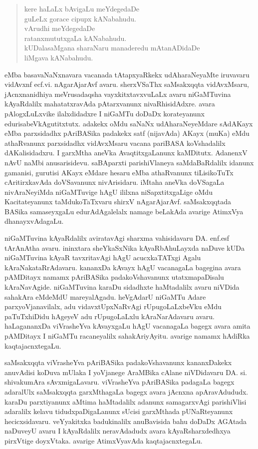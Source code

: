 \begin{quote}
kere haLaLx bAvigaLu meYdegedaDe\\[2pt]
guLeLx gorace cipupx kANabahudu.\\[2pt]
vArudhi meYdegedaDe\\[2pt]
ratanxmututxgaLa kANabahudu.\\[2pt]
kUDalasaMgana sharaNaru manaderedu mAtanADidaDe\\[2pt]
liMgava kANabahudu. 
\end{quote}

eMba basavaNaNxnavara vacanada tAtapxyaRkekx udAharaNeyaMte iruvavaru vidAvxnf ecf.vi. nAgarAjarAvf avaru. sherxVSaThx saMsakxqqta vidAvxMsaru, jAcnxnanidhiya meVrusadaqsha vayxkitxtavxvuLaLx avaru niGaMTuvina kAyaRdalilx mahatatxravAda pAtarxvanunx nivaRhi\-sidAdxre. avara pAlogxLuLxvike ilalxdidadxre I niGaMTu doDaDx korateyanunx edurisabeVkAgutitxtutx. adakekx oMdu saNaNx udA\-haraNeyeMdare sAdAKayx eMba parxsidadhx pAriBASika padakekx satf (nijavAda) AKayx (muKa) eMdu athaRvanunx parxsidadhx vidAvxMsaru vacana pariBASA koVshadalilx dAKalisidadxru. I garxMtha aneVka AvaqtitxgaLanunx kaMDitutx. AdanenxV nAvU naMbi anusarisidevu. saBAparxti parishiVlaneya saMdaBaRdalilx idanunx gamanisi, gurutisi AKayx eMdare hesaru eMba athaRvanunx tiLisikoTuTx cAritirxkavAda doVSavanunx nivArisidaru. iMtaha aneVka doVSagaLa nivAraNeyiMda niGaMTuvige hAgU ililxna  niSapxtitxgaLige oMdu Kacitateyanunx taMdukoTaTxvaru shirxV nAgarAjarAvf. saMsakxqqtada BASika samaseyxgaLu edurAdAgalelalx namage beLakAda avarige AtimxVya dhanayxvAdagaLu.

niGaMTuvina kAyaRdalilx aviratavAgi sharxma vahisidavaru DA. enf.esf tArAnAtha avaru. ininxtara sheYkaSxNika kAyaR\-bAhuLayxda naDuve kUDa niGaMTuvina kAyaR tavxritavAgi hAgU acucxkaTATxgi Agalu kAraNakataRrAdavaru. kananxDa kAvayx hAgU vacanagaLa bagegina avara pAMDitayx namamx pAriBASika padakoVshavanunx utatxmapaDisalu kAraNavAgide. niGaMTuvina karaDu sidadhxte haMtadalilx avaru niVDida sahakAra eMdeMdU mareyalAgadu. heVgAdarU niGaMTu Adare parxyoVjanavilalx, adu vidavxtUpxNaRvAgi rUpugoLaLxbeVku eMdu paTuTxhiDidu hAgeyeV adu rUpugoLaLxlu kAraNarAdavaru avaru. haLagananxDa viVrasheYva kAvayxgaLu hAgU vacanagaLa bagegx avara amita pAMDitayx I niGaMTu racaneyalilx sahakAriyAyitu. avarige namamx hAdiRka kaqtajacnxtegaLu.

saMsakxqqta viVrasheYva pAriBASika padakoVshavanunx kananxDakekx anuvAdisi koDuva mUlaka I yoVjanege AraMBika cAlane niVDidavaru DA. si.  shivakumAra sAvxmigaLavaru. viVrasheYva pAriBASika padagaLa bagegx adaralUlx saMsakxqqta garxMthagaLa bagegx avara jAcnxna apAra\-vAdududx. karaDu parxtiyanunx aMtima haMtadalilx adanunx samagarxvAgi parishiVlisi adaralilx kelavu tidudxpaDigaLanunx sUcisi garxMthada pUNaRteyanunx hecicxsidavaru. veYyakitxka badukinalilx anuBavisida bahu doDaDx AGAtada naDuveyU avaru I kAyaRdalilx neravAdadudx avara kAyaRsharxdedhxya pirxVtige doyxVtaka. avarige AtimxVyavAda kaqtajacnxtegaLu.

